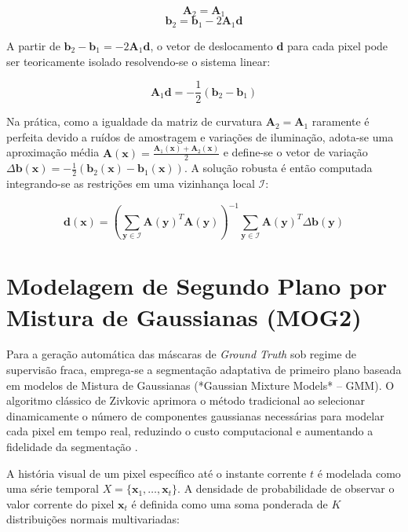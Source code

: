 \begin{equation}
    \mathbf{A}_2 = \mathbf{A}_1
\end{equation}
\begin{equation}
    \mathbf{b}_2 = \mathbf{b}_1 - 2\mathbf{A}_1\mathbf{d}
\end{equation}

A partir de $\mathbf{b}_2 - \mathbf{b}_1 = -2\mathbf{A}_1\mathbf{d}$, o vetor de deslocamento $\mathbf{d}$ para cada pixel pode ser teoricamente isolado resolvendo-se o sistema linear:

\begin{equation}
    \mathbf{A}_1\mathbf{d} = -\frac{1}{2}(\mathbf{b}_2 - \mathbf{b}_1)
\end{equation}

Na prática, como a igualdade da matriz de curvatura $\mathbf{A}_2 = \mathbf{A}_1$ raramente é perfeita devido a ruídos de amostragem e variações de iluminação, adota-se uma aproximação média $\mathbf{A}(\mathbf{x}) = \frac{\mathbf{A}_1(\mathbf{x}) + \mathbf{A}_2(\mathbf{x})}{2}$ e define-se o vetor de variação $\Delta\mathbf{b}(\mathbf{x}) = -\frac{1}{2}(\mathbf{b}_2(\mathbf{x}) - \mathbf{b}_1(\mathbf{x}))$. A solução robusta é então computada integrando-se as restrições em uma vizinhança local $\mathcal{I}$:

\begin{equation}
    \mathbf{d}(\mathbf{x}) = \left( \sum_{\mathbf{y} \in \mathcal{I}} \mathbf{A}(\mathbf{y})^T \mathbf{A}(\mathbf{y}) \right)^{-1} \sum_{\mathbf{y} \in \mathcal{I}} \mathbf{A}(\mathbf{y})^T \Delta\mathbf{b}(\mathbf{y})
\end{equation}

\section{Modelagem de Segundo Plano por Mistura de Gaussianas (MOG2)}
\label{sec:mog2}

Para a geração automática das máscaras de \textit{Ground Truth} sob regime de supervisão fraca, emprega-se a segmentação adaptativa de primeiro plano baseada em modelos de Mistura de Gaussianas (*Gaussian Mixture Models* -- GMM). O algoritmo clássico de Zivkovic aprimora o método tradicional ao selecionar dinamicamente o número de componentes gaussianas necessárias para modelar cada pixel em tempo real, reduzindo o custo computacional e aumentando a fidelidade da segmentação \cite{zivkovic2004improved}.

A história visual de um pixel específico até o instante corrente $t$ é modelada como uma série temporal $X = \{\mathbf{x}_1, \dots, \mathbf{x}_t\}$. A densidade de probabilidade de observar o valor corrente do pixel $\mathbf{x}_t$ é definida como uma soma ponderada de $K$ distribuições normais multivariadas:

